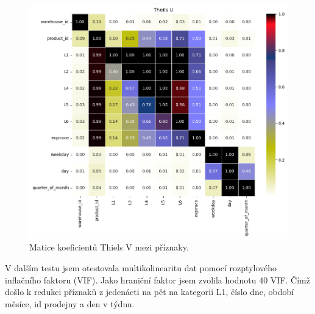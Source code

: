 \begin{figure}[hbtp!]
    \centering
    \includegraphics[width=.8\textwidth]{obrazky/zntb/theils_u.png}
    \caption{Matice koeficientů Thiels V mezi příznaky.}
    \label{obr:nb:thiels}
\end{figure}

V dalším testu jsem otestovala multikolinearitu dat pomocí rozptylového inflačního faktoru (VIF). Jako hraniční faktor jsem zvolila hodnotu 40 VIF. Čímž došlo k redukci příznaků z jedenácti na pět na kategorii L1, číslo dne, období měsíce, id prodejny a den v týdnu.

